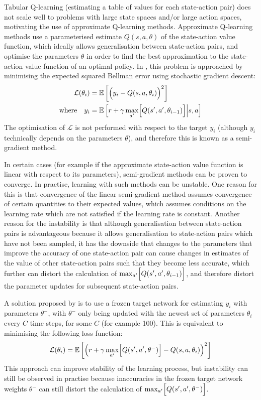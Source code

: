 Tabular Q-learning (estimating a table of values for each state-action pair) does not scale well to problems with large state spaces and/or large action spaces, motivating the use of approximate Q-learning methods. Approximate Q-learning methods use a parameterised estimate $Q(s, a, \theta)$ of the state-action value function, which ideally allows generalisation between state-action pairs, and optimise the parameters $\theta$ in order to find the best approximation to the state-action value function of an optimal policy. In \cite{mnih2013playing}, this problem is approached by minimising the expected squared Bellman error using stochastic gradient descent:
\begin{align*}
    \mathcal{L}(\theta_i) &= \mathbb{E}\left[ \Bigl(y_i - Q(s, a, \theta_i)\Bigr)^2 \right] \\
    \text{where} \quad y_i &= \mathbb{E}\left[ r + \gamma\max_{a'}\Bigl[Q(s', a', \theta_{i-1})\Bigr] \middle\vert s, a \right]
\end{align*}
The optimisation of $\mathcal{L}$ is not performed with respect to the target $y_i$ (although $y_i$ technically depends on the parameters $\theta$), and therefore this is known as a semi-gradient method.

In certain cases (for example if the approximate state-action value function is linear with respect to its parameters), semi-gradient methods can be proven to converge. In practise, learning with such methods can be unstable. One reason for this is that convergence of the linear semi-gradient method assumes convergence of certain quantities to their expected values, which assumes conditions on the learning rate which are not satisfied if the learning rate is constant. Another reason for the instability is that although generalisation between state-action pairs is advantageous because it allows generalisation to state-action pairs which have not been sampled, it has the downside that changes to the parameters that improve the accuracy of one state-action pair can cause changes in estimates of the value of other state-action pairs such that they become less accurate, which further can distort the calculation of $\max_{a'}\Bigl[Q(s', a', \theta_{i-1})\Bigr]$, and therefore distort the parameter updates for subsequent state-action pairs.

A solution proposed by \cite{mnih2015human} is to use a frozen target network for estimating $y_i$ with parameters $\theta^-$, with $\theta^-$ only being updated with the newest set of parameters $\theta_i$ every $C$ time steps, for some $C$ (for example 100). This is equivalent to minimising the following loss function:
\begin{equation*}
    \mathcal{L}(\theta_i) = \mathbb{E}\left[ \Bigl(r + \gamma\max_{a'}\Bigl[Q(s', a', \theta^-)\Bigr] - Q(s, a, \theta_i)\Bigr)^2 \right]
\end{equation*}
This approach can improve stability of the learning process, but instability can still be observed in practise because inaccuracies in the frozen target network weights $\theta^-$ can still distort the calculation of $\max_{a'}\Bigl[Q(s', a', \theta^-)\Bigr]$.

